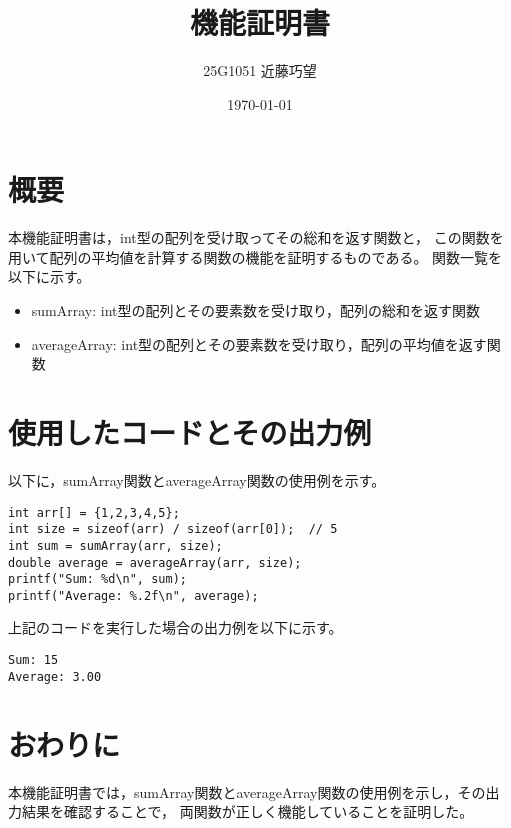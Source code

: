 \documentclass[uplatex,dvipdfmx]{jsarticle}
\begin{document}
\title{機能証明書}
\author{25G1051 近藤巧望}
\date{\today}
\maketitle
\tableofcontents
\newpage

\section{概要}
本機能証明書は，int型の配列を受け取ってその総和を返す関数と，
この関数を用いて配列の平均値を計算する関数の機能を証明するものである。
関数一覧を以下に示す。
\begin{itemize}
    \item sumArray: int型の配列とその要素数を受け取り，配列の総和を返す関数
    \item averageArray: int型の配列とその要素数を受け取り，配列の平均値を返す関数
\end{itemize}
\section{使用したコードとその出力例}
以下に，sumArray関数とaverageArray関数の使用例を示す。
\begin{verbatim}
int arr[] = {1,2,3,4,5};
int size = sizeof(arr) / sizeof(arr[0]);  // 5
int sum = sumArray(arr, size);
double average = averageArray(arr, size);
printf("Sum: %d\n", sum);              
printf("Average: %.2f\n", average);     
\end{verbatim}

上記のコードを実行した場合の出力例を以下に示す。
\begin{verbatim}
Sum: 15
Average: 3.00
\end{verbatim}

\section{おわりに}
本機能証明書では，sumArray関数とaverageArray関数の使用例を示し，その出力結果を確認することで，
両関数が正しく機能していることを証明した。
\end{document}
